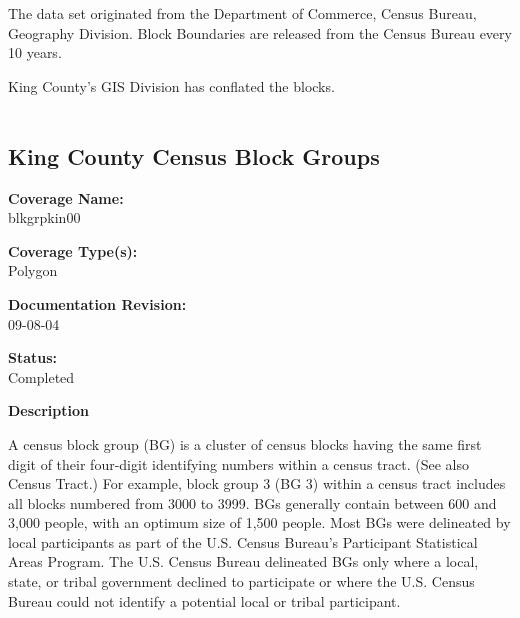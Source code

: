 The data set originated from the Department of Commerce, Census
Bureau, Geography Division. Block Boundaries are released from the
Census Bureau every 10 years.

King County's GIS Division has conflated the blocks.

\begin{landscape}
\begin{longtable}{llrrrrrc}

\end{longtable}
\end{landscape}
\newpage

%

%

\subsection{King County Census Block Groups}
{\bf \large Coverage Name:}\\
blkgrpkin00

{\bf \large Coverage Type(s):}\\
Polygon

{\bf \large Documentation Revision:}\\
09-08-04

{\bf \large Status:}\\
Completed

{\bf \large Description}

A census block group (BG) is a cluster of census blocks having the
same first digit of their four-digit identifying numbers within a
census tract. (See also Census Tract.) For example, block group 3
(BG 3) within a census tract includes all blocks numbered from
3000 to 3999. BGs generally contain between 600 and 3,000 people,
with an optimum size of 1,500 people. Most BGs were delineated by
local participants as part of the U.S. Census Bureau's Participant
Statistical Areas Program. The U.S. Census Bureau delineated BGs
only where a local, state, or tribal government declined to
participate or where the U.S. Census Bureau could not identify a
potential local or tribal participant.

